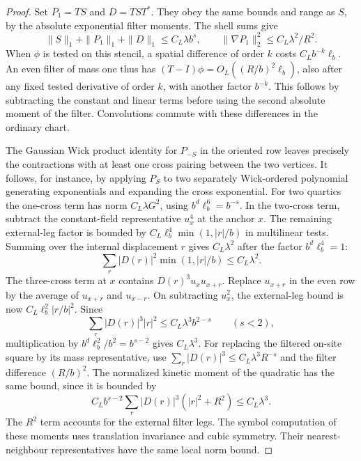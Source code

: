 \documentclass[11pt]{article}
\theoremstyle{definition}
\begin{document}
\begin{proof}
Set \(P_1=TS\) and \(D=TST^*\). They obey the same
bounds and range as \(S\), by the absolute exponential filter
moments. The shell sums give
\begin{equation}
 \|S\|_1+\|P_1\|_1+\|D\|_1\le C_L\lambda b^s,\qquad
 \|\nabla P_1\|_2^2\le C_L\lambda^2/R^2 .
\end{equation}
When \(\phi\) is tested on this stencil, a spatial difference of
order \(k\) costs \(C_L b^{-k}\ell_b\). An even filter of mass
one thus has \((T-I)\phi=O_L((R/b)^2\ell_b)\), also after
any fixed tested derivative of order \(k\), with another
factor \(b^{-k}\). This follows by subtracting the constant and
linear terms before using the second absolute moment of the filter.
Convolutions commute with these differences in the ordinary chart.

The Gaussian Wick product identity for \(P_{-S}\) in the oriented
row leaves precisely the contractions with at least one cross
pairing between the two vertices. It follows, for instance, by
applying \(P_S\) to two separately Wick-ordered polynomial
generating exponentials and expanding the cross exponential.
For two quartics the one-cross term has norm \(C_L\lambda G^2\),
using \(b^d\ell_b^6=b^{-s}\). In the two-cross term,
subtract the constant-field representative \(u_x^4\) at the
anchor \(x\). The remaining external-leg factor is bounded
by \(C_L\ell_b^4\min(1,|r|/b)\) in multilinear tests.
Summing over the internal displacement \(r\) gives
\(C_L\lambda^2\) after the factor \(b^d\ell_b^4=1\):
\begin{equation}
 \sum_r |D(r)|^2\min(1,|r|/b)\le C_L\lambda^2 .
\end{equation}
The three-cross term at \(x\) contains \(D(r)^3u_xu_{x+r}\).
Replace \(u_{x+r}\) in the even row by the average of
\(u_{x+r}\) and \(u_{x-r}\). On subtracting \(u_x^2\),
the external-leg bound is now \(C_L\ell_b^2 |r/b|^2\).
Since
\begin{equation}
 \sum_r |D(r)|^3 |r|^2
 \le C_L\lambda^3 b^{2-s}\qquad (s<2),
\end{equation}
multiplication by \(b^d\ell_b^2/b^2=b^{s-2}\)
gives \(C_L\lambda^3\). For replacing the filtered on-site
square by its mass representative, use
\(\sum_r|D(r)|^3\le C_L\lambda^3 R^{-s}\)
and the filter difference \((R/b)^2\).
The normalized kinetic moment of the quadratic has
the same bound, since it is bounded by
\begin{equation}
 C_L b^{s-2}\sum_r |D(r)|^3(|r|^2+R^2)
 \le C_L\lambda^3 .
\end{equation}
The \(R^2\) term accounts for the external filter legs.
The symbol computation of these moments uses translation
invariance and cubic symmetry. Their nearest-neighbour
representatives have the same local norm bound.


\end{proof}
\end{document}
